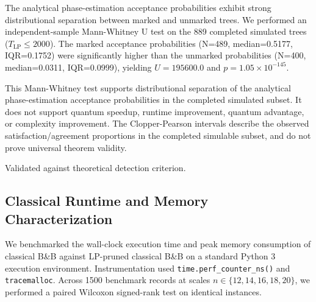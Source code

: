 \documentclass[conference]{IEEEtran} \IEEEoverridecommandlockouts
\begin{document}
The analytical phase-estimation acceptance probabilities exhibit strong distributional separation between marked and unmarked trees. We performed an independent-sample Mann-Whitney U test on the 889 completed simulated trees ($T_{\text{LP}} \le 2000$). The marked acceptance probabilities (N=489, median=0.5177, IQR=0.1752) were significantly higher than the unmarked probabilities (N=400, median=0.0311, IQR=0.0999), yielding $U = 195600.0$ and $p = 1.05\times 10^{-145}$.

This Mann-Whitney test supports distributional separation of the analytical phase-estimation acceptance probabilities in the completed simulated subset. It does not support quantum speedup, runtime improvement, quantum advantage, or complexity improvement. The Clopper-Pearson intervals describe the observed satisfaction/agreement proportions in the completed simulable subset, and do not prove universal theorem validity.

\begin{table}[htbp]
\caption{Taxonomy of Spectral Validation}
\label{tab:measured}
\begin{center}
\begin{flushleft}
\footnotesize Validated against theoretical detection criterion.
\end{flushleft}
\end{center}
\end{table}

\subsection{Classical Runtime and Memory Characterization}
We benchmarked the wall-clock execution time and peak memory consumption of classical B\&B against LP-pruned classical B\&B on a standard Python 3 execution environment. Instrumentation used \texttt{time.perf\_counter\_ns()} and \texttt{tracemalloc}. Across 1500 benchmark records at scales $n \in \{12, 14, 16, 18, 20\}$, we performed a paired Wilcoxon signed-rank test on identical instances. 
\end{document}
